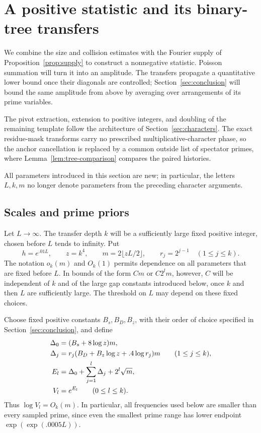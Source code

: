 \section{A positive statistic and its binary-tree transfers}
\label{sec:construction}

We combine the size and collision estimates with the Fourier supply
of Proposition~\ref{prop:supply} to construct a nonnegative statistic.
Poisson summation will turn it into an amplitude.  The transfers
propagate a quantitative lower bound once their diagonals are controlled;
Section~\ref{sec:conclusion} will bound the same amplitude from above
by averaging over arrangements of its prime variables.

The pivot extraction, extension to positive integers, and doubling of
the remaining template follow the architecture of
Section~\ref{sec:characters}.  The exact residue-mask transforms carry
no prescribed multiplicative-character phase, so the anchor cancellation
is replaced by a common outside list of spectator primes, where
Lemma~\ref{lem:tree-comparison} compares the paired histories.

All parameters introduced in this section are new; in particular, the
letters $L,k,m$ no longer denote parameters from the preceding character
arguments.

\subsection{Scales and prime priors}

Let $L\to\infty$.  The transfer depth $k$ will be a sufficiently large
fixed positive integer, chosen before $L$ tends to infinity.  Put
\[
 h=e^{.01L},\qquad z=k^4,\qquad
 m=2\lfloor zL/2\rfloor,\qquad r_j=2^{j-1}\quad(1\le j\le k).
\]
The notation $o_k(m)$ and $O_k(1)$ permits dependence on all parameters
that are fixed before $L$.  In bounds of the form $Cm$ or $C2^lm$,
however, $C$ will be independent of $k$ and of the large gap constants
introduced below, once $k$ and then $L$ are sufficiently large.  The
threshold on $L$ may depend on these fixed choices.

Choose fixed positive constants $B_s,B_D,B_z$, with their order of
choice specified in Section~\ref{sec:conclusion}, and define
\begin{align}
 \Delta_0&=(B_s+8\log z)m,\notag\\
 \Delta_j&=r_j(B_D+B_z\log z+.4\log r_j)m
       \qquad(1\le j\le k),\notag\\
 E_l&=\Delta_0+\sum_{j=1}^l\Delta_j+2^l\sqrt m,\notag\\
 V_l&=e^{E_l}\qquad(0\le l\le k).
 \label{eq:src43}
\end{align}
Thus $\log V_l=O_k(m)$.  In particular, all frequencies used below
are smaller than every sampled prime, since even the smallest prime
range has lower endpoint $\exp(\exp(.0005L))$.

